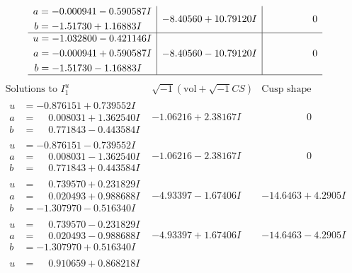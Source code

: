 \documentclass[1p]{elsarticle_modified}
\theoremstyle{definition}
\newcommand{\I}{\sqrt{-1}}
\begin{document}
$$\begin{array}{c|c|c}
\begin{aligned}
a &= -0.000941 - 0.590587 I \\
b &= -1.51730 + 1.16883 I\end{aligned}
 & -8.40560 + 10.79120 I & \phantom{-0.000000 } 0 \\ \hline\begin{aligned}
u &= -1.032800 - 0.421146 I \\
a &= -0.000941 + 0.590587 I \\
b &= -1.51730 - 1.16883 I\end{aligned}
 & -8.40560 - 10.79120 I & \phantom{-0.000000 } 0\\
 \hline 
 \end{array}$$\newpage$$\begin{array}{c|c|c}  
\text{Solutions to }I^u_{1}& \I (\text{vol} + \sqrt{-1}CS) & \text{Cusp shape}\\
 \hline 
\begin{aligned}
u &= -0.876151 + 0.739552 I \\
a &= \phantom{-}0.008031 + 1.362540 I \\
b &= \phantom{-}0.771843 - 0.443584 I\end{aligned}
 & -1.06216 + 2.38167 I & \phantom{-0.000000 } 0 \\ \hline\begin{aligned}
u &= -0.876151 - 0.739552 I \\
a &= \phantom{-}0.008031 - 1.362540 I \\
b &= \phantom{-}0.771843 + 0.443584 I\end{aligned}
 & -1.06216 - 2.38167 I & \phantom{-0.000000 } 0 \\ \hline\begin{aligned}
u &= \phantom{-}0.739570 + 0.231829 I \\
a &= \phantom{-}0.020493 + 0.988688 I \\
b &= -1.307970 - 0.516340 I\end{aligned}
 & -4.93397 - 1.67406 I & -14.6463 + 4.2905 I \\ \hline\begin{aligned}
u &= \phantom{-}0.739570 - 0.231829 I \\
a &= \phantom{-}0.020493 - 0.988688 I \\
b &= -1.307970 + 0.516340 I\end{aligned}
 & -4.93397 + 1.67406 I & -14.6463 - 4.2905 I \\ \hline\begin{aligned}
u &= \phantom{-}0.910659 + 0.868218 I \\

\end{aligned}
\end{array}$$
\end{document}
